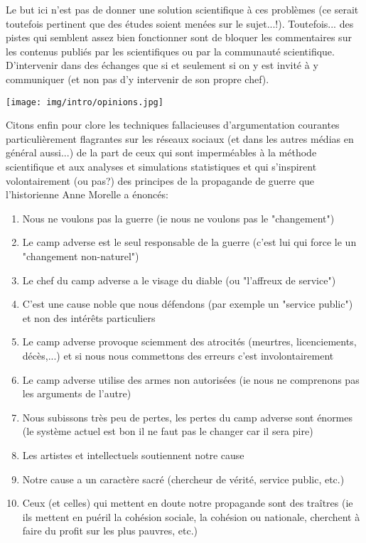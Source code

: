 	Le but ici n'est pas de donner une solution scientifique à ces problèmes (ce serait toutefois pertinent que des études soient menées sur le sujet...!). Toutefois... des pistes qui semblent assez bien fonctionner sont de bloquer les commentaires sur les contenus publiés par les scientifiques ou par la communauté scientifique. D'intervenir dans des échanges que si et seulement si on y est invité à y communiquer (et non pas d'y intervenir de son propre chef).
	\begin{center}
		\texttt{[image: img/intro/opinions.jpg]}
	\end{center}
	Citons enfin pour clore les techniques fallacieuses d'argumentation courantes particulièrement flagrantes sur les réseaux sociaux (et dans les autres médias en général aussi...) de la part de ceux qui sont imperméables à la méthode scientifique et aux analyses et simulations statistiques et qui s'inspirent volontairement (ou pas?) des principes de la propagande de guerre que l'historienne Anne Morelle a énoncés:
	\begin{enumerate}
		\item Nous ne voulons pas la guerre (ie nous ne voulons pas le "changement")
		\item Le camp adverse est le seul responsable de la guerre (c'est lui qui force le un "changement non-naturel")
		\item Le chef du camp adverse a le visage du diable (ou "l'affreux de service")
		\item C'est une cause noble que nous défendons (par exemple un "service public") et non des intérêts particuliers
		\item Le camp adverse provoque sciemment des atrocités (meurtres, licenciements, décès,...) et si nous nous commettons des erreurs c'est involontairement
		\item Le camp adverse  utilise des armes non autorisées (ie nous ne comprenons pas les arguments de l'autre)
		\item Nous subissons très peu de pertes, les pertes du camp adverse sont énormes (le système actuel est bon il ne faut pas le changer car il sera pire)
		\item Les artistes et intellectuels soutiennent notre cause 
		\item Notre cause a un caractère sacré (chercheur de vérité, service public, etc.)
		\item Ceux (et celles) qui mettent en doute notre propagande sont des traîtres (ie ils mettent en puéril la cohésion sociale, la cohésion ou nationale, cherchent à faire du profit sur les plus pauvres, etc.)
	\end{enumerate}
	
